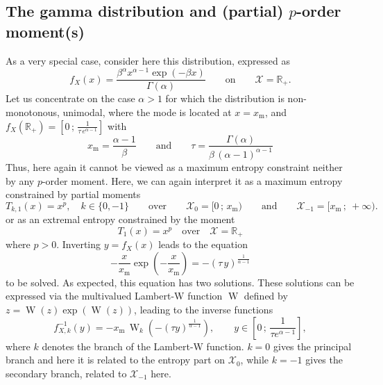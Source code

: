 \documentclass[english,sort&compress]{elsarticle}
\theoremstyle{definition}
\theoremstyle{plain}
\theoremstyle{plain}
\def\Rset{\mathbb{R}}
\def\X{\mathcal{X}}
\def\W{\operatorname{W}}
\begin{document}

\subsection{The gamma distribution and (partial) $p$-order moment(s)}

\label{subsec:GammaFirstOrder}

As a very special case, consider here this distribution, expressed
as
%
\[
f_X(x) = \frac{\beta^\alpha  x^{\alpha-1} \exp(-\beta x)}{\Gamma(\alpha)} \qquad
\mbox{on} \qquad \X = \Rset_+.
\]
%
Let  us concentrate  on the  case $\alpha  > 1$  for which  the  distribution is
non-monotonous, unimodal, where the mode is located at $x = x_{\mathrm{m}}$, and
$f_X(\Rset_+) = \left[ 0 \, ; \, \frac1{\tau \,e^{\alpha-1}} \right]$ with
%
\[
x_{\mathrm{m}}  =   \frac{\alpha-1}{\beta}  \qquad  \mbox{and}   \qquad  \tau  =
\frac{\Gamma(\alpha)}{\beta \, (\alpha-1)^{\alpha-1}}
\]
%
Thus, here again it cannot be  viewed as a maximum entropy constraint neither by
any $p$-order  moment.  Here,  we can  again interpret it  as a  maximum entropy
constrained by partial moments
%
\[
T_{k,1}(x) = x^p, \quad k \in \{ 0  , -1 \} \qquad \mbox{over} \qquad \X_0 = [ 0
\, ; \, x_{\mathrm{m}} ) \qquad  \mbox{and} \qquad \X_{-1} = [ x_{\mathrm{m}} \,
; \: +\infty ).
\]
%
or as an extremal entropy constrained by the moment 
%
\[
T_1(x) = x^p \quad \mbox{over} \quad \X = \Rset_+
\]
%
where $p > 0$. Inverting $y = f_X(x)$ leads to the equation
%
\[
-  \frac{x}{x_{\mathrm{m}}} \exp\left(  - \frac{x}{x_{\mathrm{m}}}  \right)  = -
(\tau  \,  y )^{\frac{1}{\alpha -  1}}
\]
%
to be solved. As expected, this equation has two solutions. These
solutions can be expressed via the multivalued Lambert-W function
$\W$ defined by $z=\W(z)\exp(\W(z))$, leading to the inverse functions
\[
f_{X,k}^{-1}(y) = - x_{\mathrm{m}}  \, \W_k\left( - (\tau y)^{\frac{1}{\alpha
      - 1}} \right), \qquad y \in \left[ 0 \, ; \, \frac{1}{\tau e^{\alpha - 1}}
\right],
\]
%
where  $k$  denotes  the branch  of  the  Lambert-W  function. $k=0$  gives  the
principal branch and here it is related  to the entropy part on $\X_0$, while $k
= -1$ gives the secondary branch, related to $\X_{-1}$ here.
\end{document}
